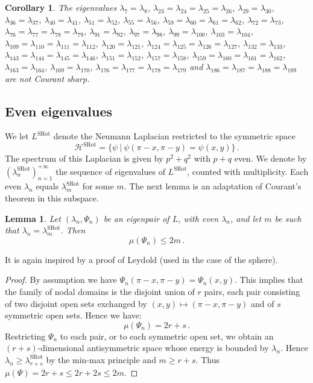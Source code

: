 \documentclass[a4paper,reqno,11pt]{amsart}
\newtheorem{lemma}[thm]{Lemma}
\newtheorem{cor}[thm]{Corollary}
\theoremstyle{remark}
\theoremstyle{definition}
\numberwithin{equation}{section}
\begin{document}
\begin{cor}
\label{cor:antisymmetric}
The eigenvalues 
$\lambda_7=\lambda_8$, 
$\lambda_{23}=\lambda_{24}=\lambda_{25}=\lambda_{26}$, 
$\lambda_{29}=\lambda_{30}$, 
$\lambda_{36}=\lambda_{37}$, 
$\lambda_{40}=\lambda_{41}$, 
$\lambda_{51}=\lambda_{52}$, 
$\lambda_{55}=\lambda_{56}$, 
$\lambda_{59}=\lambda_{60}=\lambda_{61}=\lambda_{62}$, 
$\lambda_{72}=\lambda_{73}$, 
$\lambda_{76}=\lambda_{77}=\lambda_{78}=\lambda_{79}$, 
$\lambda_{91}=\lambda_{92}$, 
$\lambda_{97}=\lambda_{98}$, 
$\lambda_{99}=\lambda_{100}$, 
$\lambda_{103}=\lambda_{104}$, 
$\lambda_{109}=\lambda_{110}=\lambda_{111}=\lambda_{112}$, 
$\lambda_{120}=\lambda_{121}$, 
$\lambda_{124}=\lambda_{125}=\lambda_{126}=\lambda_{127}$, 
$\lambda_{132}=\lambda_{133}$, 
$\lambda_{143}=\lambda_{144}=\lambda_{145}=\lambda_{146}$, 
$\lambda_{151}=\lambda_{152}$, 
$\lambda_{157}=\lambda_{158}$, 
$\lambda_{159}=\lambda_{160}=\lambda_{161}=\lambda_{162}$, 
$\lambda_{163}=\lambda_{164}$, 
$\lambda_{169}=\lambda_{170}$, 
$\lambda_{176}=\lambda_{177}=\lambda_{178}=\lambda_{179}$ and 
$\lambda_{186}=\lambda_{187}=\lambda_{188}=\lambda_{189}$ 
are not Courant sharp.
\end{cor}

\subsection{Even eigenvalues}
We let $L^{\text{SRot}}$ denote the Neumann Laplacian  restricted to the 
symmetric space 
\[
\mathcal H^{\text{SRot}} = \{\psi~|~\psi(\pi-x,\pi-y)=\psi(x,y)\}\,.
\]
The spectrum of this Laplacian is given by $p^2 + q^2$ with $p+q$ even. We 
denote by $(\lambda_n^{\text{SRot}})_{n=1}^{+\infty}$ the sequence of 
eigenvalues of $L^{\text{SRot}}$, counted with multiplicity. Each even 
$\lambda_n$ equals $\lambda_m^{\text{SRot}}$ for some $m$. The next lemma is 
an adaptation of Courant's theorem in this subspace.
\begin{lemma}
\label{lem:symmetric}
Let $(\lambda_n,\Psi_n)$ be an eigenpair of $L$, with even $\lambda_n$, and let
$m$ be such that $\lambda_n=\lambda_m^{\text{SRot}}$. Then
\[
\mu(\Psi_n) \leq 2 m\,.
\]
\end{lemma}
It is again inspired by a proof of  Leydold \cite{Ley} (used in the case of the sphere). 

\begin{proof}
By assumption we have $\Psi_n(\pi-x,\pi-y)= \Psi_n(x,y)$.
This implies  that the family of nodal domains is the disjoint union of $r$ 
pairs, each pair consisting of two disjoint open sets exchanged by 
$(x,y) \mapsto (\pi -x, \pi -y)$ and of $s$ symmetric open sets. Hence we have:
\[
\mu(\Psi_n) = 2 r + s\,.
\]
Restricting $\Psi_n$ to each pair, or to each symmetric open set, we obtain 
an $(r+s)$-dimensional antisymmetric space whose energy is bounded by $\lambda_n$. 
Hence $\lambda_n \geq \lambda_{r+s}^{\text{SRot}}$ by the min-max principle and 
$m \geq  r +s$. Thus $\mu(\Psi)=2r+s\leq 2r+2s\leq 2m$.
\end{proof}
\end{document}
